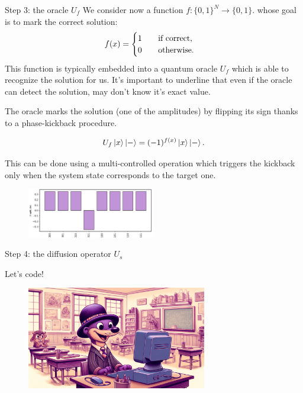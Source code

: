 \documentclass[aspectratio=169, 8pt, xcolor={svgnames}, hyperref={linkcolor=black}]{beamer}
\begin{document}
\begin{frame}{Step 3: the oracle $U_f$}
We consider now a function $f:\{0,1\}^N \to \{0,1\}.$ whose goal is to mark the correct 
solution:
$$ 
f(x) = \begin{cases}
1 \qquad \text{if\,\,correct}, \\
0 \qquad \text{otherwise}.
\end{cases} $$
This function is typically embedded into a quantum oracle $U_f$ which is able to 
recognize the solution for us. It's important to underline that even if the oracle 
can detect the solution, may don't know it's exact value.

The oracle marks the solution (one of the amplitudes) by flipping its sign thanks to
a phase-kickback procedure.

\begin{multicols}{2}
$$ U_f \ket{x}\ket{-} = (-1)^{f(x)}\ket{x}\ket{-}. $$

This can be done using a multi-controlled operation which triggers the kickback only 
when the system state corresponds to the target one.

\begin{figure}
   \includegraphics[width=0.5\textwidth]{figures/state2.png}
\end{figure}
\end{multicols}

\end{frame}

\begin{frame}{Step 4: the diffusion operator $U_s$}

\end{frame}

\begin{frame}
\centering
\Huge Let's code!
\begin{figure}
   \includegraphics[width=0.7\textwidth]{figures/hands_on.png}
\end{figure}
\end{frame}
\end{document}
